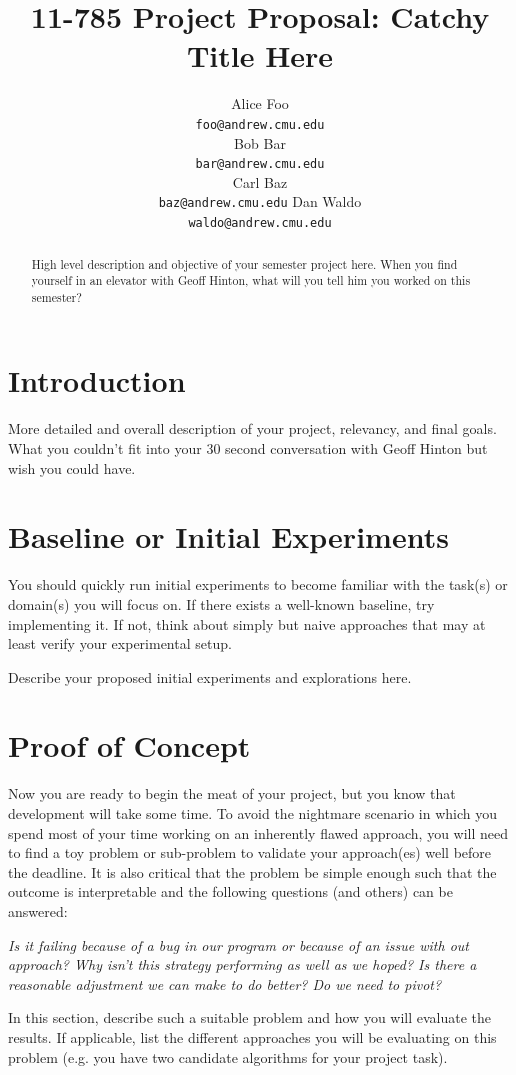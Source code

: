 \documentclass{article} %
\title{11-785 Project Proposal: Catchy Title Here}
\author{
Alice Foo \\
\texttt{foo@andrew.cmu.edu} \\
\AND
Bob Bar \\
\texttt{bar@andrew.cmu.edu} \\
\AND
Carl Baz \\
\texttt{baz@andrew.cmu.edu}
\AND
Dan Waldo \\
\texttt{waldo@andrew.cmu.edu}
}
\begin{document}
\maketitle

\begin{abstract}
High level description and objective of your semester project here. When you find yourself in an elevator with Geoff Hinton, what will you tell him you worked on this semester?
\end{abstract}

\section{Introduction}
More detailed and overall description of your project, relevancy, and final goals. What you couldn't fit into your 30 second conversation with Geoff Hinton but wish you could have.

\section{Baseline or Initial Experiments}
You should quickly run initial experiments to become familiar with the task(s) or domain(s) you will focus on. If there exists a well-known baseline, try implementing it. If not, think about simply but naive approaches that may at least verify your experimental setup. 

Describe your proposed initial experiments and explorations here.

\section{Proof of Concept}
Now you are ready to begin the meat of your project, but you know that development will take some time. To avoid the nightmare scenario in which you spend most of your time working on an inherently flawed approach, you will need to find a toy problem or sub-problem to validate your approach(es) well before the deadline. It is also critical that the problem be simple enough such that the outcome is interpretable and the following questions (and others) can be answered:

\textit{Is it failing because of a bug in our program or because of an issue with out approach? Why isn't this strategy performing as well as we hoped? Is there a reasonable adjustment we can make to do better? Do we need to pivot?}

In this section, describe such a suitable problem and how you will evaluate the results. If applicable, list the different approaches you will be evaluating on this problem (e.g. you have two candidate algorithms for your project task).
\end{document}
